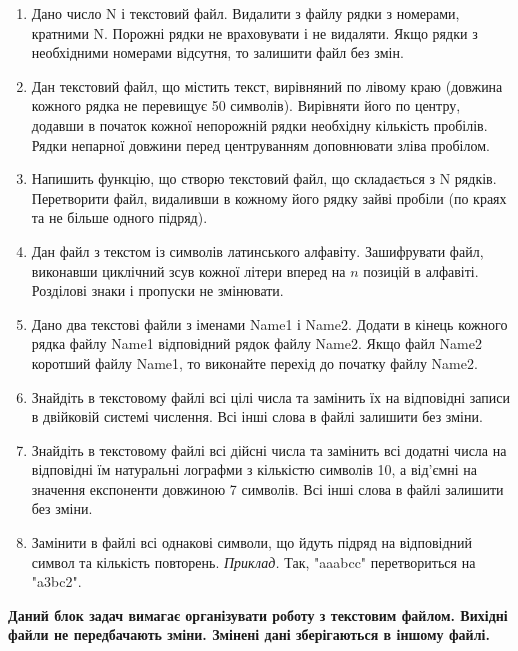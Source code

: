 \documentclass[a5paper,titlepage,openany,twoside,draft]{book_unv}%
\begin{document}
\begin{enumerate}
\def\labelenumi{\arabic{enumi})}
\setcounter{enumi}{8}
\item
  Дано число N і текстовий файл. Видалити з файлу рядки з номерами,
  кратними N. Порожні рядки не враховувати і не видаляти. Якщо рядки з
  необхідними номерами відсутня, то залишити файл без змін. 
\item
  Дан текстовий файл, що містить текст, вирівняний по лівому краю
  (довжина кожного рядка не перевищує 50 символів). Вирівняти його по
  центру, додавши в початок кожної непорожній рядки необхідну кількість
  пробілів. Рядки непарної довжини перед центруванням доповнювати зліва
  пробілом. 
\item
  Напишить функцію, що створю текстовий файл, що складається з N рядків. Перетворити
  файл, видаливши в кожному його рядку зайві пробіли (по краях та не більше одного підряд). 
\item
  Дан файл з текстом із символів латинського алфавіту. Зашифрувати файл,
  виконавши циклічний зсув кожної літери вперед на $n$ позицій в алфавіті.
  Розділові знаки і пропуски не змінювати.
\item
  Дано два текстові файли з іменами Name1 і Name2. Додати в кінець
  кожного рядка файлу Name1 відповідний рядок файлу Name2. Якщо файл
  Name2 коротший файлу Name1, то виконайте перехід до початку файлу
  Name2.

\item
 Знайдіть в текстовому файлі всі цілі числа та замінить їх на відповідні записи
в двійковій системі числення.  Всі інші слова в файлі залишити без зміни.

\item
 Знайдіть в текстовому файлі всі дійсні числа та замінить всі додатні числа на відповідні їм
натуральні лографми з кількістю символів 10, а від'ємні на значення експоненти довжиною 7
символів. Всі інші слова в файлі залишити без зміни.

\item
Замінити в файлі всі однакові символи, що йдуть підряд на відповідний символ та кількість повторень.
\emph{Приклад.} Так, "aaabcc" перетвориться на "a3bc2".

\end{enumerate}

\textbf{Даний блок задач вимагає організувати роботу з текстовим файлом.
 Вихідні файли не передбачають зміни. Змінені дані зберігаються в іншому файлі.}
\end{document}
